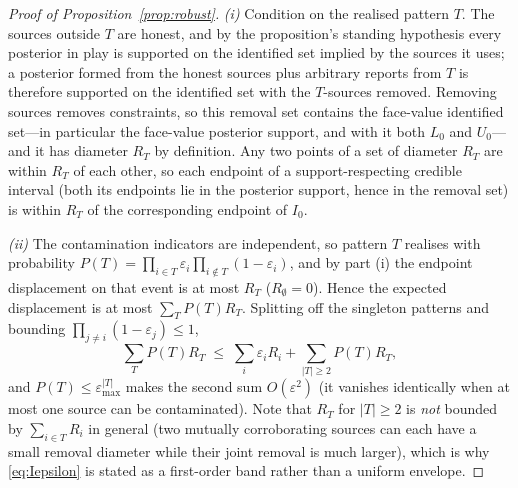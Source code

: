 \begin{proof}[Proof of Proposition~\ref{prop:robust}]
\emph{(i)} Condition on the realised pattern $T$. The sources outside $T$ are honest, and by the proposition's standing hypothesis every posterior in play is supported on the identified set implied by the sources it uses; a posterior formed from the honest sources plus arbitrary reports from $T$ is therefore supported on the identified set with the $T$-sources removed. Removing sources removes constraints, so this removal set contains the face-value identified set---in particular the face-value posterior support, and with it both $L_0$ and $U_0$---and it has diameter $R_T$ by definition. Any two points of a set of diameter $R_T$ are within $R_T$ of each other, so each endpoint of a support-respecting credible interval (both its endpoints lie in the posterior support, hence in the removal set) is within $R_T$ of the corresponding endpoint of $I_0$.

\emph{(ii)} The contamination indicators are independent, so pattern $T$ realises with probability $P(T)=\prod_{i\in T}\varepsilon_i\prod_{i\notin T}(1-\varepsilon_i)$, and by part (i) the endpoint displacement on that event is at most $R_T$ ($R_\emptyset=0$). Hence the expected displacement is at most $\sum_T P(T)R_T$. Splitting off the singleton patterns and bounding $\prod_{j\ne i}(1-\varepsilon_j)\le 1$,
\[
\sum_T P(T)R_T\;\le\;\sum_i\varepsilon_i R_i+\sum_{|T|\ge 2}P(T)R_T,
\]
and $P(T)\le\varepsilon_{\max}^{|T|}$ makes the second sum $O(\varepsilon^2)$ (it vanishes identically when at most one source can be contaminated). Note that $R_T$ for $|T|\ge 2$ is \emph{not} bounded by $\sum_{i\in T}R_i$ in general (two mutually corroborating sources can each have a small removal diameter while their joint removal is much larger), which is why \eqref{eq:Iepsilon} is stated as a first-order band rather than a uniform envelope.


\end{proof}
